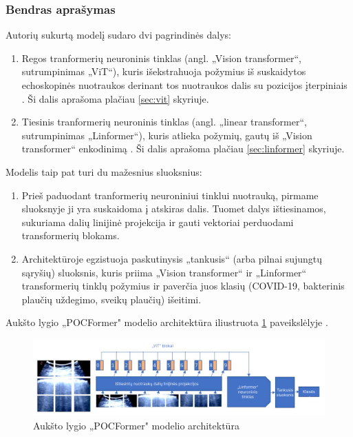 \documentclass[fleqn]{VUMIFKompMagistrinis}
\begin{document}
\subsubsection{Bendras aprašymas}
Autorių sukurtą modelį sudaro dvi pagrindinės dalys: 
\begin{enumerate}
    \item Regos tranformerių neuroninis tinklas (angl. „Vision transformer“, sutrumpinimas „ViT“), kuris išekstrahuoja požymius iš suskaidytos echoskopinės nuotraukos derinant tos nuotraukos dalis su pozicijos įterpiniais \cite{PAY21}. Ši dalis aprašoma plačiau \ref{sec:vit} skyriuje.
    \item Tiesinis tranformerių neuroninis tinklas (angl. „linear transformer“, sutrumpinimas „Linformer“), kuris atlieka požymių, gautų iš „Vision transformer“ enkodinimą \cite{PAY21}. Ši dalis aprašoma plačiau \ref{sec:linformer} skyriuje.
\end{enumerate}
\par
Modelis taip pat turi du mažesnius sluoksnius:
\begin{enumerate}
    \item Prieš paduodant tranformerių neuroniniui tinklui nuotrauką, pirmame sluoksnyje ji yra suskaidoma į atskiras dalis. Tuomet dalys ištiesinamos, sukuriama dalių linijinė projekcija ir gauti vektoriai perduodami transformerių blokams. \cite{PAY21}
    \item Architektūroje egzistuoja paskutinysis „tankusis“ (arba pilnai sujungtų sąryšių) sluoksnis, kuris priima „Vision transformer“ ir „Linformer“ transformerių tinklų požymius ir paverčia juos klasių (COVID-19, bakterinis plaučių uždegimo, sveikų plaučių) išeitimi. \cite{PAY21}
\end{enumerate}
Aukšto lygio „POCFormer" modelio architektūra iliustruota \ref{img:POCFormer} paveikslėlyje .
\begin{figure}[H]
    \centering
    \includegraphics[scale=0.45]{img/transformerisMain.png}
    \caption{Aukšto lygio „POCFormer" modelio architektūra \cite{PAY21}}
    \label{img:POCFormer}
\end{figure}
\end{document}
